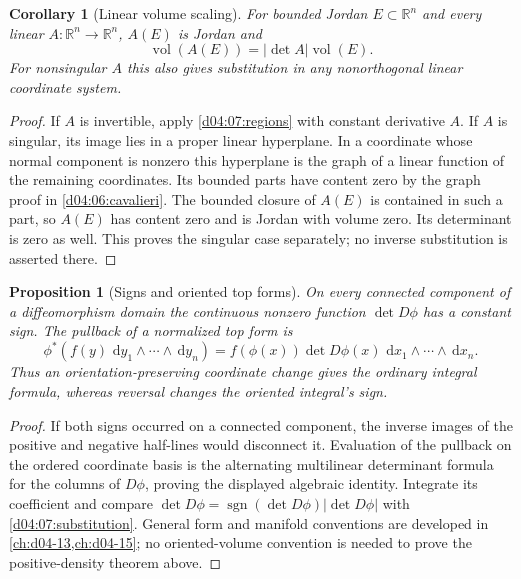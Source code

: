 \documentclass[11pt,oneside,openany]{book}
\newtheorem{proposition}[theorem]{Proposition}
\newtheorem{corollary}[theorem]{Corollary}
\theoremstyle{definition}
\theoremstyle{remark}
\newcommand{\R}{\mathbb R}
\newcommand{\dd}{\,\mathrm d}
\DeclareMathOperator{\vol}{vol}
\DeclareMathOperator{\sgn}{sgn}
\newcommand{\family}[1]{}
\begin{document}
\family{K04.07.01}\family{K04.07.08}
\begin{corollary}[Linear volume scaling]\label{d04:07:linear-volume}
For bounded Jordan $E\subset\R^n$ and every linear $A:\R^n\to\R^n$, $A(E)$ is Jordan and
\[
 \vol(A(E))=|\det A|\vol(E).
\]
For nonsingular $A$ this also gives substitution in any nonorthogonal linear coordinate system.
\end{corollary}
\begin{proof}
If $A$ is invertible, apply \cref{d04:07:regions} with constant derivative $A$. If $A$ is singular, its image lies in a proper linear hyperplane. In a coordinate whose normal component is nonzero this hyperplane is the graph of a linear function of the remaining coordinates. Its bounded parts have content zero by the graph proof in \cref{d04:06:cavalieri}. The bounded closure of $A(E)$ is contained in such a part, so $A(E)$ has content zero and is Jordan with volume zero. Its determinant is zero as well. This proves the singular case separately; no inverse substitution is asserted there.
\end{proof}

\family{K04.07.04}
\begin{proposition}[Signs and oriented top forms]\label{d04:07:orientation}
On every connected component of a diffeomorphism domain the continuous nonzero function $\det D\phi$ has a constant sign. The pullback of a normalized top form is
\[
 \phi^*(f(y)\,\dd y_1\wedge\cdots\wedge\dd y_n)
 =f(\phi(x))\det D\phi(x)\,\dd x_1\wedge\cdots\wedge\dd x_n.
\]
Thus an orientation-preserving coordinate change gives the ordinary integral formula, whereas reversal changes the oriented integral's sign.
\end{proposition}
\begin{proof}
If both signs occurred on a connected component, the inverse images of the positive and negative half-lines would disconnect it. Evaluation of the pullback on the ordered coordinate basis is the alternating multilinear determinant formula for the columns of $D\phi$, proving the displayed algebraic identity. Integrate its coefficient and compare $\det D\phi=\sgn(\det D\phi)|\det D\phi|$ with \cref{d04:07:substitution}. General form and manifold conventions are developed in \cref{ch:d04-13,ch:d04-15}; no oriented-volume convention is needed to prove the positive-density theorem above.
\end{proof}
\end{document}
